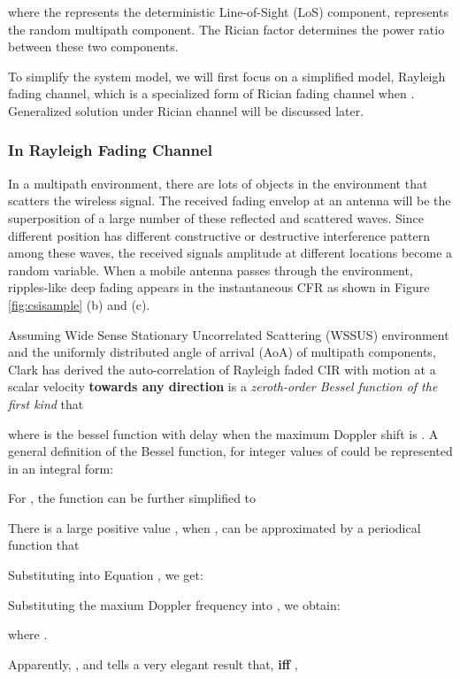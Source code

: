 where the  represents the deterministic Line-of-Sight (LoS)
component,  represents the random multipath component. The
Rician factor  determines the power ratio between these two
components.

To simplify the system model, we will first focus on a simplified
model, Rayleigh fading channel, which is a specialized form of Rician
fading channel when . Generalized solution under Rician channel
will be discussed later.

\subsubsection{In Rayleigh Fading Channel}

In a multipath environment, there are lots of objects in the
environment that scatters the wireless signal. The received fading
envelop at an antenna will be the superposition of a large number of
these reflected and scattered waves. Since different position has
different constructive or destructive interference pattern among these
waves, the received signals amplitude at different locations become a
random variable. When a mobile antenna passes through the environment,
ripples-like deep fading appears in the instantaneous CFR as shown in
Figure \ref{fig:csisample} (b) and (c).

Assuming Wide Sense Stationary Uncorrelated Scattering (WSSUS)
 environment and the uniformly distributed angle of arrival (AoA) of
 multipath components, Clark \cite{Clark} has derived the
 auto-correlation of Rayleigh faded CIR  with motion at a scalar
 velocity  \textbf{towards any direction} is a \textit{zeroth-order Bessel
function
  of the first kind} that

where  is the bessel function with delay  when the
maximum Doppler shift is
 .
A general definition of the Bessel function, for integer values of 
 could be represented in an integral form:

For , the function can be further simplified to

There is a large positive value  , when ,
 can be approximated by a periodical function
that

Substituting  into Equation , we get:

Substituting the maxium Doppler frequency 
into  , we obtain:

where .

Apparently, , and  
tells a very elegant result that, \textbf{iff} ,


